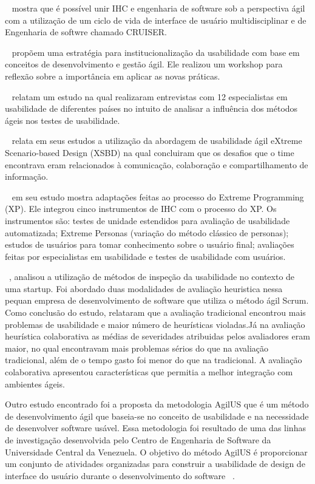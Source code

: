 ~ mostra que é possível unir IHC e engenharia de software sob a perspectiva ágil com a utilização de um ciclo de vida de interface de usuário multidisciplinar e de Engenharia de softwre chamado CRUISER.

~ propõem uma estratégia para institucionalização da usabilidade com base em conceitos de desenvolvimento e gestão ágil. Ele realizou um workshop para reflexão sobre a importância em aplicar as novas práticas.

~ relatam um estudo na qual realizaram entrevistas com 12 especialistas em usabilidade de diferentes países no intuito de analisar a influência dos métodos ágeis nos testes de usabilidade. 

~ relata em seus estudos a utilização da abordagem de usabilidade ágil eXtreme Scenario-based Design (XSBD) na qual concluiram que os desafios que o time encontrava eram relacionados à comunicação, colaboração e compartilhamento de informação.

~ em seu estudo mostra adaptações feitas ao processo do Extreme Programming (XP). Ele integrou cinco instrumentos de IHC com o processo do XP. Os instrumentos são: testes de unidade estendidos para avaliação de usabilidade automatizada; Extreme Personas (variação do método clássico de personas); estudos de usuários para tomar conhecimento sobre o usuário final; avaliações feitas por especialistas em usabilidade e testes de usabilidade com usuários.
 
~, analisou a utilização de métodos de inspeção da usabilidade no contexto de uma startup. Foi abordado duas modalidades de avaliação heuristica nessa pequan empresa de desenvolvimento de software que utiliza o método ágil Scrum. Como conclusão do estudo, relataram que a avaliação tradicional encontrou mais problemas de usabilidade e maior número de heurísticas violadas.Já na avaliação heurística colaborativa as médias de severidades atribuidas pelos avaliadores eram maior, no qual encontravam mais problemas sérios do que na avaliação tradicional, além de o tempo gasto foi menor do que na tradicional. A avaliação colaborativa apresentou características que permitia a melhor integração com ambientes ágeis.

	Outro estudo encontrado foi a proposta da metodologia AgilUS que é um método de desenvolvimento ágil que baseia-se no conceito de usabilidade e na necessidade de desenvolver software usável. Essa metodologia foi resultado de uma das linhas de investigação desenvolvida pelo Centro de Engenharia de Software da Universidade Central da Venezuela. O objetivo do método AgilUS é proporcionar um conjunto de atividades organizadas para construir a usabilidade de design de interface do usuário durante o desenvolvimento do software ~\citeauthor{acostaagilus}.

